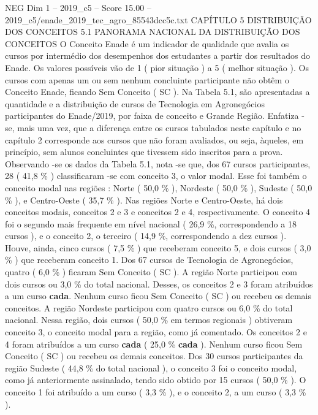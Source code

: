 \begin{textsample}{NEG Dim 1 – 2019\_c5 – Score 15.00 – 2019\_c5/enade\_2019\_tec\_agro\_85543dcc5c.txt}  \label{ex:f1_neg_393}
CAPÍTULO 5 DISTRIBUIÇÃO DOS CONCEITOS 5.1 PANORAMA NACIONAL DA DISTRIBUIÇÃO DOS CONCEITOS O Conceito Enade é um indicador de qualidade que avalia os cursos por intermédio dos desempenhos dos estudantes a partir dos resultados do Enade.
Os valores possíveis vão de 1 ( pior situação ) a 5 ( melhor situação ).
Os cursos com apenas um ou sem nenhum concluinte participante não obtêm o Conceito Enade, ficando Sem Conceito ( SC ).
Na Tabela 5.1, são apresentadas a quantidade e a distribuição de cursos de Tecnologia em Agronegócios participantes do Enade/2019, por faixa de conceito e Grande Região.
Enfatiza -se, mais uma vez, que a diferença entre os cursos tabulados neste capítulo e no capítulo 2 corresponde aos cursos que não foram avaliados, ou seja, àqueles, em princípio, sem alunos concluintes que tivessem sido inscritos para a prova.
Observando -se os dados da Tabela 5.1, nota -se que, dos 67 cursos participantes, 28 ( 41,8 \% ) classificaram -se com conceito 3, o valor modal.
Esse foi também o conceito modal nas regiões : Norte ( 50,0 \% ), Nordeste ( 50,0 \% ), Sudeste ( 50,0 \% ), e Centro-Oeste ( 35,7 \% ).
Nas regiões Norte e Centro-Oeste, há dois conceitos modais, conceitos 2 e 3 e conceitos 2 e 4, respectivamente.
O conceito 4 foi o segundo mais frequente em nível nacional ( 26,9 \%, correspondendo a 18 cursos ), e o conceito 2, o terceiro ( 14,9 \%, correspondendo a dez cursos ).
Houve, ainda, cinco cursos ( 7,5 \% ) que receberam conceito 5, e dois cursos ( 3,0 \% ) que receberam conceito 1.
Dos 67 cursos de Tecnologia de Agronegócios, quatro ( 6,0 \% ) ficaram Sem Conceito ( SC ).
A região Norte participou com dois cursos ou 3,0 \% do total nacional.
Desses, os conceitos 2 e 3 foram atribuídos a um curso \textbf{cada}.
Nenhum curso ficou Sem Conceito ( SC ) ou recebeu os demais conceitos.
A região Nordeste participou com quatro cursos ou 6,0 \% do total nacional.
Nessa região, dois cursos ( 50,0 \% em termos regionais ) obtiveram conceito 3, o conceito modal para a região, como já comentado.
Os conceitos 2 e 4 foram atribuídos a um curso \textbf{cada} ( 25,0 \% \textbf{cada} ).
Nenhum curso ficou Sem Conceito ( SC ) ou recebeu os demais conceitos.
Dos 30 cursos participantes da região Sudeste ( 44,8 \% do total nacional ), o conceito 3 foi o conceito modal, como já anteriormente assinalado, tendo sido obtido por 15 cursos ( 50,0 \% ).
O conceito 1 foi atribuído a um curso ( 3,3 \% ), e o conceito 2, a um curso ( 3,3 \% ).

\end{textsample}
